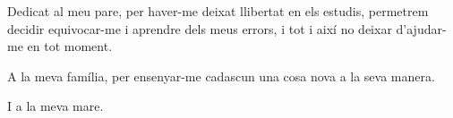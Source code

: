 
\begin{dedication} %


Dedicat al meu pare, per haver-me deixat llibertat en els estudis, permetrem decidir equivocar-me i aprendre dels meus errors, i tot i així no deixar d'ajudar-me en tot moment.

A la meva família, per ensenyar-me cadascun una cosa nova a la seva manera.

I a la meva mare.


\end{dedication}


